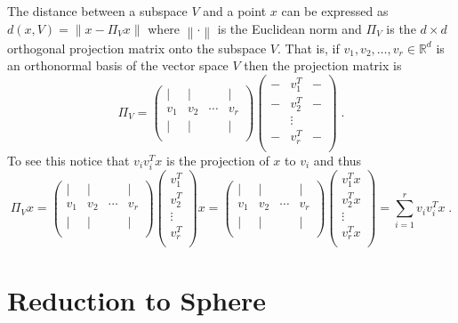 \documentclass{article}
\newcommand{\R}{\mathbb{R}}
\newcommand{\norm}[1]{\left\|#1\right\|}
\begin{document}
The distance between a subspace $V$ and a point $x$ can be expressed as
$d(x,V) = \norm{x - \Pi_V x}$
where $\norm{\cdot}$ is the Euclidean norm and $\Pi_V$ is
the $d \times d$ orthogonal projection matrix onto the subspace $V$.
That is, if $v_1, v_2, \dots, v_r \in \R^d$ is an orthonormal basis
of the vector space $V$ then the projection matrix is
$$
\Pi_V =
\begin{pmatrix}
\vert & \vert &  & \vert \\
v_1 & v_2 & \cdots & v_r \\
\vert & \vert &  & \vert \\
\end{pmatrix}
\begin{pmatrix}
- & v_1^T & - \\
- & v_2^T & - \\
  & \vdots &  \\
- & v_r^T & - \\
\end{pmatrix} \; .
$$
To see this notice that $v_i v_i^T x$ is the projection of $x$ to $v_i$
and thus
$$
\Pi_V x
=
\begin{pmatrix}
\vert & \vert &  & \vert \\
v_1 & v_2 & \cdots & v_r \\
\vert & \vert &  & \vert \\
\end{pmatrix}
\begin{pmatrix}
v_1^T \\
v_2^T \\
\vdots  \\
v_r^T \\
\end{pmatrix}
x
=
\begin{pmatrix}
\vert & \vert &  & \vert \\
v_1 & v_2 & \cdots & v_r \\
\vert & \vert &  & \vert \\
\end{pmatrix}
\begin{pmatrix}
v_1^T x\\
v_2^T x\\
\vdots  \\
v_r^T x\\
\end{pmatrix}
= \sum_{i=1}^r v_i v_i^T x \; .
$$

\section{Reduction to Sphere}
\end{document}
